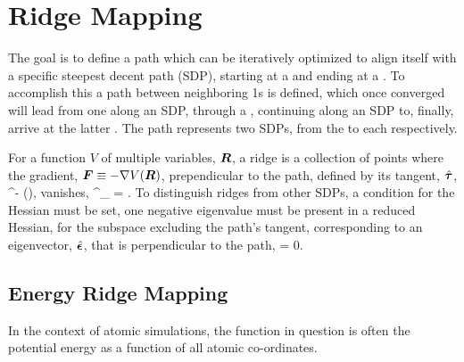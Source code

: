 \section{Ridge Mapping}
The goal is to define a path which can be iteratively optimized to align itself with a specific steepest decent path (SDP),
starting at a  and ending at a .
To accomplish this a path between neighboring \sap1s is defined,
which once converged will lead from one  along an SDP,
through a ,
continuing along an SDP to, finally, arrive at the latter .
The path represents two SDPs, from the  to each  respectively.

For a function $V$ of multiple variables, ${\bm{R}}$, a ridge is a collection of points where the gradient, ${\bm{F}} \equiv -\nabla V({\bm{R}})$, prependicular to the path, defined by its tangent, $\hat{{\bm{\tau}}}$,
\beq
\vF^\perp \equiv \vF - (\vF \cdot \uvt)\uvt,
\eeq
vanishes,
\beq
\vF^\perp_ = .
\eeq
To distinguish ridges from other SDPs,
a condition for the Hessian must be set,
one negative eigenvalue must be present in a reduced Hessian, for the subspace excluding the path's tangent,
corresponding to an eigenvector, $\hat{{\bm{\epsilon}}}$, that is perpendicular to the path,
\beq
\uvn \cdot \uvt = 0.
\eeq



\incomplete

\subsection{Energy Ridge Mapping}
In the context of atomic simulations, the function in question is often the potential energy as a function of all atomic co-ordinates.

\incomplete

